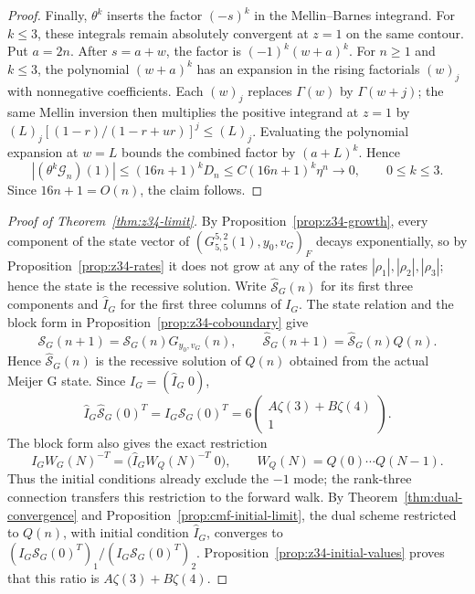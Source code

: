 \begin{proof}
Finally, $\theta^k$ inserts the factor $(-s)^k$ in the Mellin--Barnes
integrand. For $k\leq3$, these integrals
remain absolutely convergent at $z=1$ on the same contour.
Put $a=2n$. After $s=a+w$, the factor is
$(-1)^k(w+a)^k$.
For $n\geq1$ and $k\leq3$, the polynomial $(w+a)^k$ has an expansion
in the rising factorials $(w)_j$ with nonnegative coefficients.
Each $(w)_j$ replaces $\Gamma(w)$ by $\Gamma(w+j)$; the same Mellin
inversion then multiplies the positive integrand at $z=1$ by
$(L)_j[(1-r)/(1-r+ur)]^j\leq(L)_j$.
Evaluating the polynomial expansion at $w=L$ bounds the combined
factor by $(a+L)^k$. Hence
\[
|(\theta^k\mathcal{G}_n)(1)|
\leq
(16n+1)^kD_n
\leq C(16n+1)^k\eta^n\longrightarrow0,
\qquad 0\leq k\leq3.
\]
Since $16n+1=O(n)$, the claim follows.
\end{proof}

\begin{proof}[Proof of Theorem~\ref{thm:z34-limit}]
By Proposition~\ref{prop:z34-growth}, every component of the
state vector of $(G^{5,2}_{5,5}(1),y_0,v_G)_F$ decays exponentially, so by
Proposition~\ref{prop:z34-rates} it does not grow at any of the rates
$|\rho_1|,|\rho_2|,|\rho_3|$; hence the state is the recessive solution.
Write $\widehat{\mathcal S}_G(n)$ for its first three components and
$\widehat I_G$ for the first three columns of $I_G$.
The state relation and the block form in
Proposition~\ref{prop:z34-coboundary} give
\[
\mathcal S_G(n+1)=\mathcal S_G(n)G_{y_0,v_G}(n),
\qquad
\widehat{\mathcal S}_G(n+1)=\widehat{\mathcal S}_G(n)Q(n).
\]
Hence $\widehat{\mathcal S}_G(n)$ is the recessive solution of $Q(n)$
obtained from the actual Meijer G state. Since $I_G=(\widehat I_G\;0)$,
\[
\widehat I_G\widehat{\mathcal S}_G(0)^T
=I_G\mathcal S_G(0)^T
=6\begin{pmatrix}A\zeta(3)+B\zeta(4)\\1\end{pmatrix}.
\]
The block form also gives the exact restriction
\[
I_GW_G(N)^{-T}
=\bigl(\widehat I_GW_Q(N)^{-T}\;0\bigr),
\qquad W_Q(N)=Q(0)\cdots Q(N-1).
\]
Thus the initial conditions already exclude the $-1$ mode; the
rank-three connection transfers this restriction to the forward walk.
By Theorem~\ref{thm:dual-convergence} and
Proposition~\ref{prop:cmf-initial-limit}, the dual scheme restricted to
$Q(n)$, with initial condition $\widehat I_G$, converges to
$(I_G\mathcal{S}_G(0)^T)_1/(I_G\mathcal{S}_G(0)^T)_2$.
Proposition~\ref{prop:z34-initial-values} proves that this ratio is
$A\zeta(3)+B\zeta(4)$.


\end{proof}
